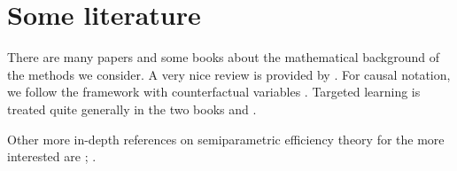 \documentclass{article}
\newcommand{\1}{\mathbb{1}}
\begin{document}
\section{Some literature}

There are many papers and some books about the mathematical background
of the methods we consider. A very nice review is provided by
\cite{kennedy2016semiparametric}. %
For causal notation, we follow the framework with counterfactual
variables \cite{hernanrobins}. Targeted learning is treated quite
generally in the two books \cite{van2011targeted} and
\cite{van2018targeted}.
 
Other more in-depth references on semiparametric efficiency theory for
the more interested are
\cite{bickel1993efficient,van2000asymptotic,vanRobins2003unified,
  tsiatis2007semiparametric}; \citet[][Appendix A]{ van2011targeted}.


\end{document}
